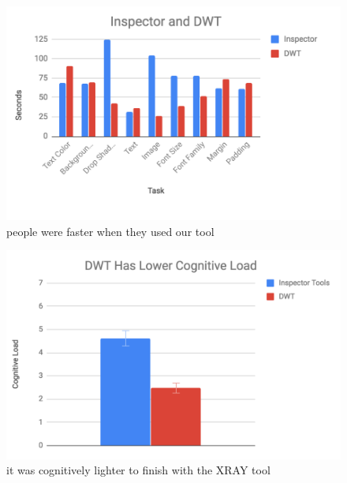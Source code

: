 \documentclass{sigchi}
\begin{document}
\begin{figure}
    \centering
    \includegraphics[width=\columnwidth]{real_figures/inspector_dwt.PNG}
    \caption{people were faster when they used our tool}  
    \label{fig:xray_screenshot}
\end{figure}

\begin{figure}
    \centering
    \includegraphics[width=\columnwidth]{real_figures/cognitive_load.PNG}
    \caption{it was cognitively lighter to finish with the XRAY tool}  
    \label{fig:xray_screenshot}
\end{figure}
\end{document}

